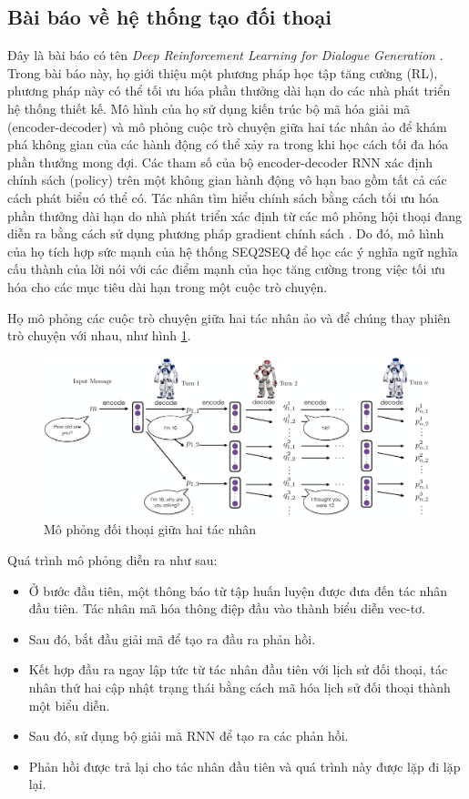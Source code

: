 \subsection{Bài báo về hệ thống tạo đối thoại}
Đây là bài báo có tên \textit{Deep Reinforcement Learning for
Dialogue Generation} \cite{generation}. Trong bài báo này, họ
giới thiệu một phương pháp học tập tăng cường (RL), phương pháp này
có thể tối ưu hóa phần thưởng dài hạn do các nhà phát triển hệ thống
thiết kế. Mô hình của họ sử dụng kiến trúc bộ mã hóa giải mã
(encoder-decoder) và mô phỏng cuộc trò chuyện giữa hai tác nhân ảo
để khám phá không gian của các hành động có thể xảy ra trong khi
học cách tối đa hóa phần thưởng mong đợi. Các tham số của bộ
encoder-decoder RNN xác định chính sách (policy) trên một không gian
hành động vô hạn bao gồm tất cả các cách phát biểu có thể có.
Tác nhân tìm hiểu chính sách bằng cách tối ưu hóa phần thưởng
dài hạn do nhà phát triển xác định từ các mô phỏng hội thoại
đang diễn ra bằng cách sử dụng phương pháp gradient chính sách
\cite{gradient}. Do đó, mô hình của họ tích hợp sức mạnh của hệ thống
SEQ2SEQ để học các ý nghĩa ngữ nghĩa cấu thành của lời nói với các
điểm mạnh của học tăng cường trong việc tối ưu hóa cho các mục tiêu
dài hạn trong một cuộc trò chuyện.

Họ mô phỏng các cuộc trò chuyện giữa hai tác nhân ảo và để chúng
thay phiên trò chuyện với nhau, như hình \ref{fig:generation}.

\begin{figure}[ht]
    \centering
    \includegraphics[width=1\textwidth]{thesis/chatbot/congtrinh/img/generation.png}
    \caption{Mô phỏng đối thoại giữa hai tác nhân}
    \label{fig:generation}
\end{figure}

Quá trình mô phỏng diễn ra như sau:

\begin{itemize}
    \item Ở bước đầu tiên, một thông báo từ tập huấn luyện được đưa
    đến tác nhân đầu tiên. Tác nhân mã hóa thông điệp đầu vào thành
    biểu diễn vec-tơ.
    \item Sau đó, bắt đầu giải mã để tạo ra đầu ra phản hồi.
    \item Kết hợp đầu ra ngay lập tức từ tác nhân đầu tiên với
    lịch sử đối thoại, tác nhân thứ hai cập nhật trạng thái
    bằng cách mã hóa lịch sử đối thoại thành một biểu diễn.
    \item Sau đó, sử dụng bộ giải mã RNN để tạo ra các phản hồi.
    \item Phản hồi được trả lại cho tác nhân đầu tiên và quá trình
    này được lặp đi lặp lại.
\end{itemize}

